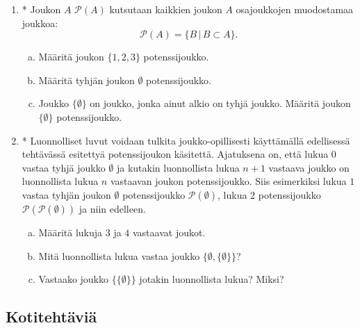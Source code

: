 \begin{enumerate}
\item *
Joukon $A$  $\mathcal{P}(A)$ kutsutaan kaikkien joukon $A$ osajoukkojen muodostamaa joukkoa:
\[
\mathcal{P}(A)=\{ B \, | \, B\subset A\}.
\]
\begin{enumerate}[a)]
\item Määritä joukon $\{1, 2, 3\}$ potenssijoukko.
\item Määritä tyhjän joukon $\emptyset$ potenssijoukko.
\item Joukko $\{\emptyset\}$ on joukko, jonka ainut alkio on tyhjä joukko. Määritä joukon $\{\emptyset\}$ potenssijoukko.
\end{enumerate}

\item *
Luonnolliset luvut voidaan tulkita joukko-opillisesti käyttämällä edellisessä tehtävässä esitettyä potenssijoukon käsitettä. Ajatuksena on, että lukua $0$ vastaa tyhjä joukko $\emptyset$ ja kutakin luonnollista lukua $n + 1$ vastaava joukko on luonnollista lukua $n$ vastaavan joukon potenssijoukko. Siis esimerkiksi lukua $1$ vastaa tyhjän joukon $\emptyset$ potenssijoukko $\mathcal{P}(\emptyset)$, lukua $2$ potenssijoukko $\mathcal{P}(\mathcal{P}(\emptyset))$ ja niin edelleen.
\begin{enumerate}[a)]
\item Määritä lukuja $3$ ja $4$ vastaavat joukot.
\item Mitä luonnollista lukua vastaa joukko $\{\emptyset,\{\emptyset\}\}$?
\item Vastaako joukko $\{\{\emptyset\}\}$ jotakin luonnollista lukua? Miksi?
\end{enumerate}

\end{enumerate}

\subsection*{Kotitehtäviä}

